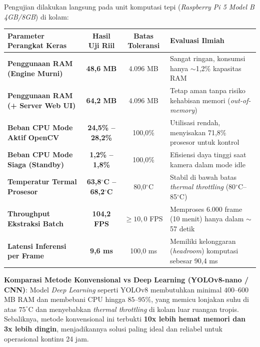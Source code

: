 \documentclass[10pt,a4paper]{article}
\begin{document}
Pengujian dilakukan langsung pada unit komputasi tepi (\textit{Raspberry Pi 5 Model B 4GB/8GB}) di kolam:

\begin{center}
\small
\begin{tabular}{|l|c|c|p{8.5cm}|}
\hline
\textbf{Parameter Perangkat Keras} & \textbf{Hasil Uji Riil} & \textbf{Batas Toleransi} & \textbf{Evaluasi Ilmiah} \\
\hline
\textbf{Penggunaan RAM (Engine Murni)} & \textbf{48,6 MB} & 4.096 MB & Sangat ringan, konsumsi hanya $\sim$1,2\% kapasitas RAM \\
\textbf{Penggunaan RAM (+ Server Web UI)} & \textbf{64,2 MB} & 4.096 MB & Tetap aman tanpa risiko kehabisan memori (\textit{out-of-memory}) \\
\textbf{Beban CPU Mode Aktif OpenCV} & \textbf{24,5\% -- 28,2\%} & 100,0\% & Utilisasi rendah, menyisakan 71,8\% prosesor untuk kontrol \\
\textbf{Beban CPU Mode Siaga (Standby)} & \textbf{1,2\% -- 1,8\%} & 100,0\% & Efisiensi daya tinggi saat kamera dalam mode idle \\
\textbf{Temperatur Termal Prosesor} & \textbf{63,8$^\circ$C -- 68,2$^\circ$C} & 80,0$^\circ$C & Stabil di bawah batas \textit{thermal throttling} (80$^\circ$C--85$^\circ$C) \\
\textbf{Throughput Ekstraksi Batch} & \textbf{104,2 FPS} & $\ge 10,0$ FPS & Memproses 6.000 frame (10 menit) hanya dalam $\sim$57 detik \\
\textbf{Latensi Inferensi per Frame} & \textbf{9,6 ms} & 100,0 ms & Memiliki kelonggaran (\textit{headroom}) komputasi sebesar 90,4 ms \\
\hline
\end{tabular}
\end{center}

\textbf{Komparasi Metode Konvensional vs Deep Learning (YOLOv8-nano / CNN)}:
Model \textit{Deep Learning} seperti YOLOv8 membutuhkan minimal $400$--$600$ MB RAM dan membebani CPU hingga $85$--$95\%$, yang memicu lonjakan suhu di atas $75^\circ$C dan menyebabkan \textit{thermal throttling} di kolam luar ruangan tropis. Sebaliknya, metode konvensional ini terbukti \textbf{10x lebih hemat memori dan 3x lebih dingin}, menjadikannya solusi paling ideal dan reliabel untuk operasional kontinu 24 jam.

\end{document}
